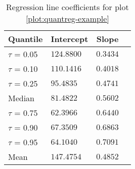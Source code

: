 %
\begin{table}[h]
\caption{Regression line coefficients for plot \ref{plot:quantreg-example}}
\begin{center}
\begin{tabular}{llll}
\hline\hline
\multicolumn{1}{c}{Quantile}&\multicolumn{1}{c}{Intercept}&\multicolumn{1}{c}{Slope}\tabularnewline
\hline
$\tau$ = 0.05&$124.8800$&$0.3434$\tabularnewline
$\tau$ = 0.10&$110.1416$&$0.4018$\tabularnewline
$\tau$ = 0.25&$ 95.4835$&$0.4741$\tabularnewline
Median&$ 81.4822$&$0.5602$\tabularnewline
$\tau$ = 0.75&$ 62.3966$&$0.6440$\tabularnewline
$\tau$ = 0.90&$ 67.3509$&$0.6863$\tabularnewline
$\tau$ = 0.95&$ 64.1040$&$0.7091$\tabularnewline
Mean&$147.4754$&$0.4852$\tabularnewline
\hline
\end{tabular}
\end{center}
\label{table:quantreg-example}
\end{table}